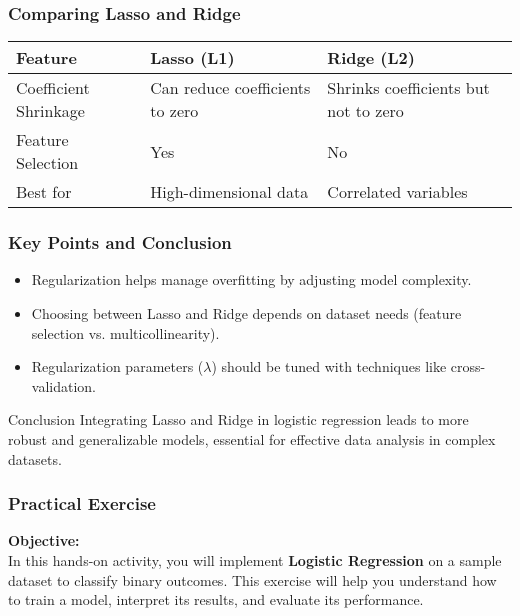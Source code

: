 \documentclass[aspectratio=169]{beamer}
\begin{document}
\begin{frame}[fragile]
    \frametitle{Comparing Lasso and Ridge}
    \begin{tabular}{|l|l|l|}
        \hline
        \textbf{Feature} & \textbf{Lasso (L1)} & \textbf{Ridge (L2)} \\ 
        \hline
        Coefficient Shrinkage & Can reduce coefficients to zero & Shrinks coefficients but not to zero  \\ 
        \hline
        Feature Selection & Yes & No \\ 
        \hline
        Best for & High-dimensional data & Correlated variables \\ 
        \hline
    \end{tabular}
\end{frame}

\begin{frame}[fragile]
    \frametitle{Key Points and Conclusion}
    \begin{itemize}
        \item Regularization helps manage overfitting by adjusting model complexity.
        \item Choosing between Lasso and Ridge depends on dataset needs (feature selection vs. multicollinearity).
        \item Regularization parameters ($\lambda$) should be tuned with techniques like cross-validation.
    \end{itemize}
    \begin{block}{Conclusion}
        Integrating Lasso and Ridge in logistic regression leads to more robust and generalizable models, essential for effective data analysis in complex datasets.
    \end{block}
\end{frame}

\begin{frame}
    \frametitle{Practical Exercise}
    \textbf{Objective:} \\
    In this hands-on activity, you will implement \textbf{Logistic Regression} on a sample dataset to classify binary outcomes. This exercise will help you understand how to train a model, interpret its results, and evaluate its performance.
\end{frame}
\end{document}
